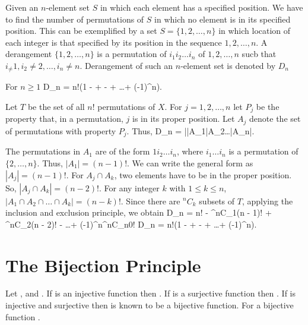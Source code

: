 Given an $n$-element set $S$ in which each element has a specified position. We have to find the number of permutations of $S$ in
which no element is in its specified position. This can be exemplified by a set $S = \{1, 2, \ldots, n\}$ in which location of each
integer is that specified by its position in the sequence $1, 2, \ldots, n$. A derangement $\{1, 2, \ldots, n\}$ is a permutation
of $i_1i_2\ldots i_n$ of $1, 2, \ldots, n$ sucb that $i_\neq 1, i_2\neq 2, \ldots, i_n\neq n$. Derangement of such an $n$-element
set is denoted by $D_n$

For $n\geq 1$ \startformula D_n = n!\left(1 -  +  -  + \ldots + (-1)^n\right).\stopformula

Let $T$ be the set of all $n!$ permutations of $X$. For $j = 1, 2, \ldots, n$ let $P_j$ be the property that, in a permutation, $j$
is in its proper position. Let $A_j$ denote the set of permutations with property $P_j$. Thus, \startformula D_n = |\bar{A_1}\cap\bar{A_2}\cap\ldots\cap\bar{A_n}|.\stopformula

The permutations in $A_1$ are of the form $1i_2\ldots i_n$, where $i_1\ldots i_n$ is a permutation of $\{2, \ldots, n\}$. Thus,
$|A_1| = (n - 1)!$. We can write the general form as $|A_j| = (n - 1)!$. For $A_j\cap A_k$, two elements have to be in the proper
position. So, $|A_j\cap A_k| = (n - 2)!$. For any integer $k$ with $1\leq k\leq n$, $|A_1\cap A_2\cap \ldots\cap A_k| = (n -
k)!$. Since there are ${}^nC_k$ subsets of $T$, applying the inclusion and exclusion principle, we obtain
\startformula D_n = n! - {}^nC_1(n - 1)! + {}^nC_2(n - 2)! - \ldots + (-1)^n{}^nC_n0!\stopformula
\startformula \Rightarrow D_n = n!\left(1 -  +  -  + \ldots + (-1)^n\right).\stopformula

\section{The Bijection Principle}
Let , and . If  is an
injective function then . If  is a surjective function then . If
 is injective and surjective then  is known to be a bijective function. For a
bijective function .
